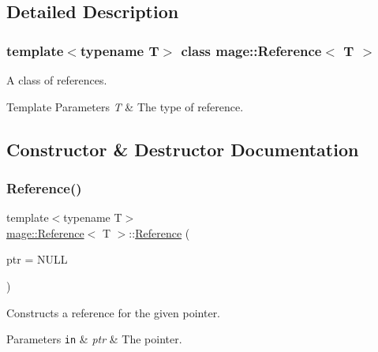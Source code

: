 \subsection{Detailed Description}
\subsubsection*{template$<$typename T$>$\newline
class mage\+::\+Reference$<$ T $>$}

A class of references.


\begin{DoxyTemplParams}{Template Parameters}
{\em T} & The type of reference. \\
\hline
\end{DoxyTemplParams}


\subsection{Constructor \& Destructor Documentation}
\hypertarget{classmage_1_1_reference_a62039d823993670fdb8c3ddedcc794c7}{}\label{classmage_1_1_reference_a62039d823993670fdb8c3ddedcc794c7} 
\subsubsection{\texorpdfstring{Reference()}{Reference()}\hspace{0.1cm}{\footnotesize\ttfamily [1/2]}}
{\footnotesize\ttfamily template$<$typename T$>$ \\
\hyperlink{classmage_1_1_reference}{mage\+::\+Reference}$<$ T $>$\+::\hyperlink{classmage_1_1_reference}{Reference} (\begin{DoxyParamCaption}\item[{T $\ast$}]{ptr = {\ttfamily NULL} }\end{DoxyParamCaption})}

Constructs a reference for the given pointer.


\begin{DoxyParams}[1]{Parameters}
\mbox{\tt in}  & {\em ptr} & The pointer. \\
\hline
\end{DoxyParams}
\hypertarget{classmage_1_1_reference_abc471d0d652884353af99f7c668a467d}{}\label{classmage_1_1_reference_abc471d0d652884353af99f7c668a467d} 
